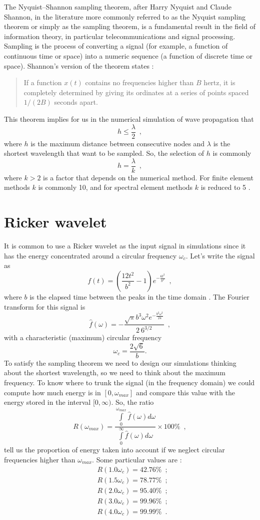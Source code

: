 \documentclass[12pt,letterpaper,landscape]{article}
\begin{document}
The Nyquist–Shannon sampling theorem, after Harry Nyquist and Claude
Shannon, in the literature more commonly referred to as the Nyquist
sampling theorem or simply as the sampling theorem, is a fundamental
result in the field of information theory, in particular telecommunications
and signal processing. Sampling is the process of converting a signal
(for example, a function of continuous time or space) into a numeric
sequence (a function of discrete time or space). Shannon's version
of the theorem states \cite{Shannon}:
\begin{quote}
If a function $x(t)$ contains no frequencies higher than $B$ hertz,
it is completely determined by giving its ordinates at a series of
points spaced $1/(2B)$ seconds apart. 
\end{quote}
This theorem implies for us in the numerical simulation of wave propagation
that 
\[
h\leq\frac{\lambda}{2}\enspace,
\]
 where $h$ is the maximum distance between consecutive nodes and
$\lambda$ is the shortest wavelength that want to be sampled. So,
the selection of $h$ is commonly 
\[
h=\frac{\lambda}{k}\enspace,
\]
 where $k>2$ is a factor that depends on the numerical method. For
finite element methods $k$ is commonly 10, and for spectral element
methods $k$ is reduced to 5 \cite{Komatitsch99}.


\section{Ricker wavelet}

It is common to use a Ricker wavelet as the input signal in simulations
since it has the energy concentrated around a circular frequency $\omega_{c}$.
Let's write the signal as 
\[
f(t)=\left(\frac{12t^{2}}{b^{2}}-1\right)e^{-\frac{6t^{2}}{b^{2}}}\enspace,
\]
 where $b$ is the elapsed time between the peaks in the time domain
\cite{Papageorgiou91}. The Fourier transform for this signal is 
\[
\hat{f}(\omega)=-\frac{\sqrt{\pi}b^{3}\omega^{2}e^{-\frac{b^{2}\omega^{2}}{24}}}{2\ 6^{3/2}}\enspace,
\]
 with a characteristic (maximum) circular frequency 
\[
\omega_{c}=\frac{2\sqrt{6}}{b}.
\]
 To satisfy the sampling theorem we need to design our simulations
thinking about the shortest wavelength, so we need to think about
the maximum frequency. To know where to trunk the signal (in the frequency
domain) we could compute how much energy is in $[0,\omega_{max}]$
and compare this value with the energy stored in the interval $[0,\infty)$.
So, the ratio 
\[
R(\omega_{max})=\frac{\int\limits _{0}^{\omega_{max}}\hat{f}(\omega)d\omega}{\int\limits _{0}^{\infty}\hat{f}(\omega)d\omega}\times100\%\enspace,
\]
 tell us the proportion of energy taken into account if we neglect
circular frequencies higher than $\omega_{max}$. Some particular
values are : 
\begin{align}
 & R(1.0\omega_{c})=42.76\%\enspace;\\
 & R(1.5\omega_{c})=78.77\%\enspace;\\
 & R(2.0\omega_{c})=95.40\%\enspace;\\
 & R(3.0\omega_{c})=99.96\%\enspace;\\
 & R(4.0\omega_{c})=99.99\%\enspace.
\end{align}
\end{document}
